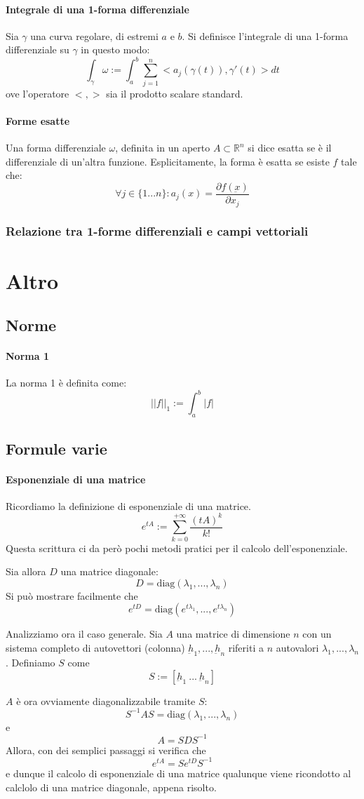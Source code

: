 \documentclass[a4paper,12pt]{article}
\begin{document}
\paragraph{Integrale di una 1-forma differenziale}
Sia $\gamma$ una curva regolare, di estremi $a$ e $b$.
Si definisce l'integrale di una 1-forma differenziale su $\gamma$ in questo modo:
$$\int_\gamma \omega:=\int_a^b \sum_{j=1}^n <a_j(\gamma(t)), \gamma'(t)> dt$$
ove l'operatore $<,>$ sia il prodotto scalare standard.
\paragraph{Forme esatte}
Una forma differenziale $\omega$, definita in un aperto $A\subset\mathbb{R}^n$ si dice esatta se è il differenziale di un'altra funzione.
Esplicitamente, la forma è esatta se esiste $f$ tale che:
$$\forall j\in\{1 ... n\}: a_j(x) = \frac{\partial f(\underbar{x})}{\partial x_j}$$
\subsubsection{Relazione tra 1-forme differenziali e campi vettoriali}

\section{Altro}
\subsection{Norme}
\paragraph{Norma 1}
La norma 1 è definita come:
$$||f||_1 := \int_a^b|f|$$
\subsection{Formule varie}
\paragraph{Esponenziale di una matrice}
Ricordiamo la definizione di esponenziale di una matrice.
$$e^{tA} := \sum_{k=0}^{+\infty} \dfrac{(tA)^k}{k!}$$
Questa scrittura ci da però pochi metodi pratici per il calcolo dell'esponenziale.

Sia allora $D$ una matrice diagonale:
$$D=\text{diag}(\lambda_1,...,\lambda_n)$$
Si può mostrare facilmente che
$$e^{tD} = \text{diag}(e^{t\lambda_1}, ..., e^{t\lambda_n})$$

Analizziamo ora il caso generale.
Sia $A$ una matrice di dimensione $n$ con un sistema completo di autovettori (colonna) $\underbar{h}_1, ..., \underbar{h}_n$ riferiti a $n$ autovalori $\lambda_1, ..., \lambda_n$. Definiamo $S$ come
$$S:=[\underbar{h}_1\ ...\ \underbar{h}_n]$$

$A$ è ora ovviamente diagonalizzabile tramite $S$:
$$S^{-1}AS=\text{diag}(\lambda_1,...,\lambda_n)$$
e
$$A = SDS^{-1}$$
Allora, con dei semplici passaggi si verifica che
$$e^{tA} = Se^{tD}S^{-1}$$
e dunque il calcolo di esponenziale di una matrice qualunque viene ricondotto al calclolo di una matrice diagonale, appena risolto.
\end{document}
